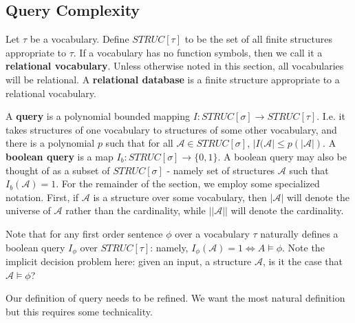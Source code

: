 \subsection{Query Complexity}
\begin{definition}
	Let $\tau$ be a vocabulary. Define $STRUC[\tau]$ to be the set of all finite structures appropriate to $\tau$. If a vocabulary has no function symbols, then we call it a \textbf{relational vocabulary}. Unless otherwise noted in this section, all vocabularies will be relational. A \textbf{relational database} is a finite structure appropriate to a relational vocabulary.
\end{definition}
\begin{definition}
	A \textbf{query} is a polynomial bounded mapping $I: STRUC[\sigma] \to STRUC[\tau]$. I.e. it takes structures of one vocabulary to structures of some other vocabulary, and there is a polynomial $p$ such that for all $\mathcal{A} \in STRUC[\sigma]$, $|I(\mathcal{A}| \leq p(|\mathcal{A}|)$. A \textbf{boolean query} is a map $I_b: STRUC[\sigma] \to \{0,1\}$. A boolean query may also be thought of as a subset of $STRUC[\sigma]$ - namely set of structures $\mathcal{A}$ such that $I_b(\mathcal{A}) = 1$. 
For the remainder of the section, we employ some specialized notation. First, if $\mathcal{A}$ is a structure over some vocabulary, then $|\mathcal{A}|$ will denote the universe of $\mathcal{A}$ rather than the cardinality, while $||\mathcal{A}||$ will denote the cardinality.
\end{definition}
Note that for any first order sentence $\phi$ over a vocabulary $\tau$ naturally defines a boolean query $I_{\phi}$ over $STRUC[\tau]$: namely, $I_{\phi}(\mathcal{A}) = 1 \iff A \models \phi$. Note the implicit decision problem here: given an input, a structure $\mathcal{A}$, is it the case that $\mathcal{A} \models \phi$? 
\par Our definition of query needs to be refined. We want the most natural definition but this requires some technicality.

